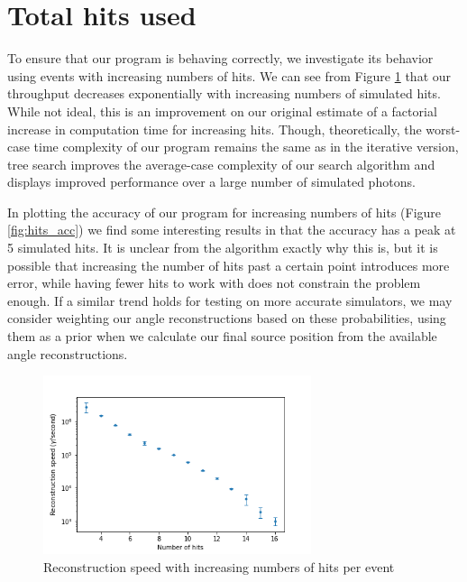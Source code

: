 \section{Total hits used}
\label{totalhits}
To ensure that our program is behaving correctly, we investigate its behavior using events with increasing numbers of hits. We can see from Figure \ref{fig:hits_speed} that our throughput decreases exponentially with increasing numbers of simulated hits. While not ideal, this is an improvement on our original estimate of a factorial increase in computation time for increasing hits. Though, theoretically, the worst-case time complexity of our program remains the same as in the iterative version, tree search improves the average-case complexity of our search algorithm and displays improved performance over a large number of simulated photons.

In plotting the accuracy of our program for increasing numbers of hits (Figure \ref{fig:hits_acc}) we find some interesting results in that the accuracy has a peak at 5 simulated hits. It is unclear from the algorithm exactly why this is, but it is possible that increasing the number of hits past a certain point introduces more error, while having fewer hits to work with does not constrain the problem enough. If a similar trend holds for testing on more accurate simulators, we may consider weighting our angle reconstructions based on these probabilities, using them as a prior when we calculate our final source position from the available angle reconstructions.

\begin{figure}
    \centering
    \includegraphics[width=0.7\textwidth]{graphs/pi_hits_speed.png}
    \caption{Reconstruction speed with increasing numbers of hits per event}
    \label{fig:hits_speed}
\end{figure}

